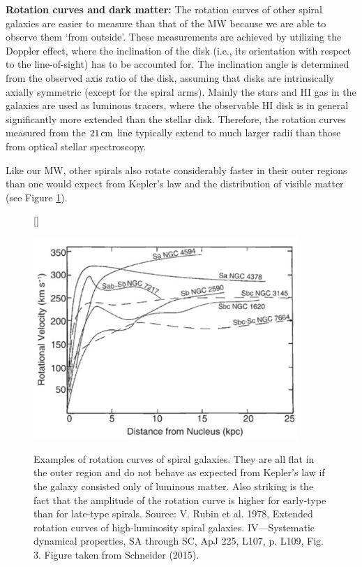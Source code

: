 \documentclass[a4paper,10pt]{article}
\begin{document}
{\noindent}\textbf{Rotation curves and dark matter:} The rotation curves of other spiral galaxies are easier to measure than that of the MW because we are able to observe them `from outside'. These measurements are achieved by utilizing the Doppler effect, where the inclination of the disk (i.e., its orientation with respect to the line-of-sight) has to be accounted for. The inclination angle is determined from the observed axis ratio of the disk, assuming that disks are intrinsically axially symmetric (except for the spiral arms). Mainly the stars and HI gas in the galaxies are used as luminous tracers, where the observable HI disk is in general significantly more extended than the stellar disk. Therefore, the rotation curves measured from the $21\,{\rm cm}$ line typically extend to much larger radii than those from optical stellar spectroscopy.

{\noindent}Like our MW, other spirals also rotate considerably faster in their outer regions than one would expect from Kepler's law and the distribution of visible matter (see Figure \ref{fig:rotationcurvesspirals}).

\begin{figure}[h]
    [\FBwidth]
    {\caption{\footnotesize{Examples of rotation curves of spiral galaxies. They are all flat in the outer region and do not behave as expected from Kepler's law if the galaxy consisted only of luminous matter. Also striking is the fact that the amplitude of the rotation curve is higher for early-type than for late-type spirals. Source: V. Rubin et al. 1978, Extended rotation curves of high-luminosity spiral galaxies. IV—Systematic dynamical properties, SA through SC, ApJ 225, L107, p. L109, Fig. 3. Figure taken from Schneider (2015).}}
    \label{fig:rotationcurvesspirals}}
    {\includegraphics[width=10cm]{figures/RotationCurves_spirals.png}}
\end{figure}
\end{document}
